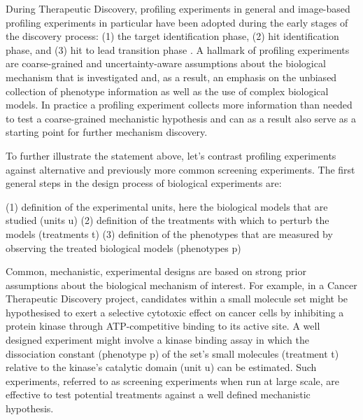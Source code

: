 \begin{flushleft}
During Therapeutic Discovery, profiling experiments in general and image-based profiling experiments in particular have been adopted during the early stages of the discovery process: (1) the target identification phase, (2) hit identification phase, and (3) hit to lead transition phase \cite{chandrasekaranImagebasedProfilingDrug2021}. A hallmark of profiling experiments are coarse-grained and uncertainty-aware assumptions about the biological mechanism that is investigated and, as a result, an emphasis on the unbiased collection of phenotype information as well as the use of complex biological models. In practice a profiling experiment collects more information than needed to test a coarse-grained mechanistic hypothesis and can as a result also serve as a starting point for further mechanism discovery. 

To further illustrate the statement above, let's contrast profiling experiments against alternative and previously more common screening experiments. The first general steps in the design process of biological experiments are:

(1) definition of the experimental units, here the biological models that are studied (units u)
(2) definition of the treatments with which to perturb the models (treatments t)
(3) definition of the phenotypes that are measured by observing the treated biological models (phenotypes p)

Common, mechanistic, experimental designs are based on strong prior assumptions about the biological mechanism of interest. For example, in a Cancer Therapeutic Discovery project, candidates within a small molecule set might be hypothesised to exert a selective cytotoxic effect on cancer cells by inhibiting a protein kinase through ATP-competitive binding to its active site. A well designed experiment might involve a kinase binding assay in which the dissociation constant (phenotype p) of the set's small molecules (treatment t) relative to the kinase's catalytic domain (unit u) can be estimated. Such experiments, referred to as screening experiments when run at large scale, are effective to test potential treatments against a well defined mechanistic hypothesis. 


\end{flushleft}
